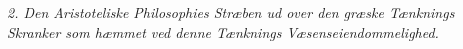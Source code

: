 \divrule

\emph{2. Den Aristoteliske Philosophies Stræben ud
over den græske Tænknings Skranker som hæmmet
ved denne Tænknings Væsenseiendommelighed.}

